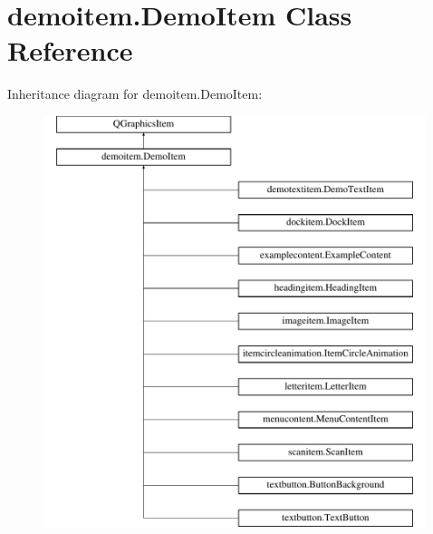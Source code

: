 \hypertarget{classdemoitem_1_1DemoItem}{}\section{demoitem.\+Demo\+Item Class Reference}
\label{classdemoitem_1_1DemoItem}
Inheritance diagram for demoitem.\+Demo\+Item\+:\begin{figure}[H]
\begin{center}
\leavevmode
\includegraphics[height=12.000000cm]{classdemoitem_1_1DemoItem}
\end{center}
\end{figure}
